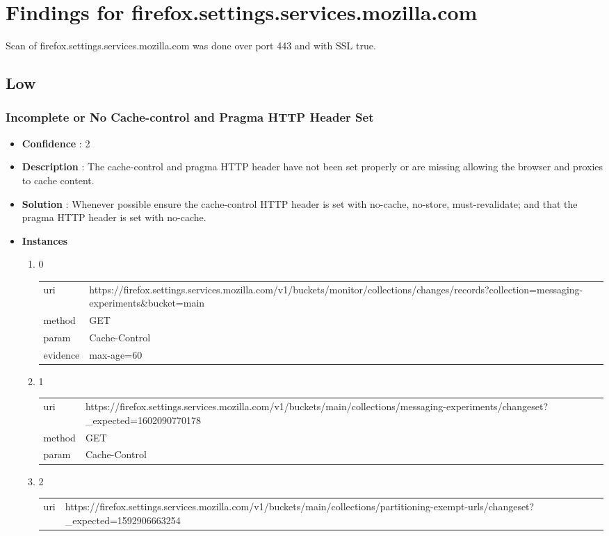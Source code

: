 \documentclass[10pt]{article}
\begin{document}
\section{Findings for firefox.settings.services.mozilla.com}
Scan of firefox.settings.services.mozilla.com was done over port 443 and with SSL true.
\subsection{Low}
\subsubsection{Incomplete or No Cache-control and Pragma HTTP Header Set}
\begin{itemize}
\item[] \textbf{Confidence} : 2
\item[] \textbf{Description} : The cache-control and pragma HTTP header have not been set properly or are missing allowing the browser and proxies to cache content.
\item[] \textbf{Solution} :  Whenever possible ensure the cache-control HTTP header is set with no-cache, no-store, must-revalidate; and that the pragma HTTP header is set with no-cache.
\item[] \textbf{Instances}
\begin{enumerate}
\item[] 0
\begin{tabular}{| l | p{12cm}}
uri & https://firefox.settings.services.mozilla.com/v1/buckets/monitor/collections/changes/records?collection=messaging-experiments\&bucket=main \\
method & GET \\
param & Cache-Control \\
evidence & max-age=60 \\
\end{tabular}
\item[] 1
\begin{tabular}{| l | p{12cm}}
uri & https://firefox.settings.services.mozilla.com/v1/buckets/main/collections/messaging-experiments/changeset?\_expected=1602090770178 \\
method & GET \\
param & Cache-Control \\
\end{tabular}
\item[] 2
\begin{tabular}{| l | p{12cm}}
uri & https://firefox.settings.services.mozilla.com/v1/buckets/main/collections/partitioning-exempt-urls/changeset?\_expected=1592906663254 \\

\end{tabular}
\end{enumerate}
\end{itemize}
\end{document}
